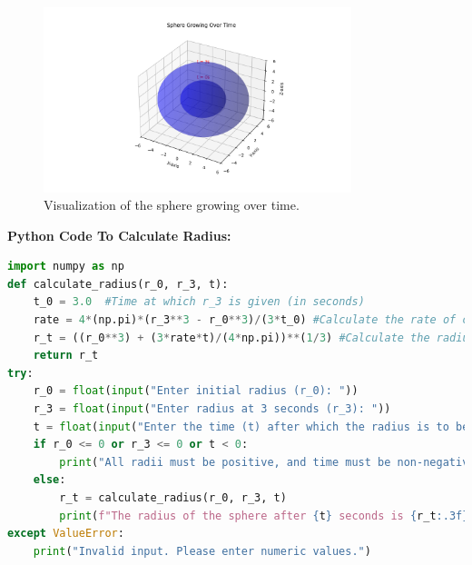 \documentclass[journal]{IEEEtran}
\numberwithin{equation}{enumi}
\numberwithin{figure}{enumi}
\begin{document}
\begin{figure}[H]
    \centering
    \includegraphics[width=0.8\textwidth]{figs/growing_sphere.png}
    \caption{Visualization of the sphere growing over time.}
\end{figure}

\textbf{Python Code To Calculate Radius:}
\begin{lstlisting}[language=Python]
import numpy as np
def calculate_radius(r_0, r_3, t):
    t_0 = 3.0  #Time at which r_3 is given (in seconds) 
    rate = 4*(np.pi)*(r_3**3 - r_0**3)/(3*t_0) #Calculate the rate of change of volume
    r_t = ((r_0**3) + (3*rate*t)/(4*np.pi))**(1/3) #Calculate the radius at time t
    return r_t
try:
    r_0 = float(input("Enter initial radius (r_0): "))
    r_3 = float(input("Enter radius at 3 seconds (r_3): "))
    t = float(input("Enter the time (t) after which the radius is to be found: "))
    if r_0 <= 0 or r_3 <= 0 or t < 0:
        print("All radii must be positive, and time must be non-negative.")
    else:
        r_t = calculate_radius(r_0, r_3, t)
        print(f"The radius of the sphere after {t} seconds is {r_t:.3f} units.")
except ValueError:
    print("Invalid input. Please enter numeric values.")
\end{lstlisting}
\end{document}
